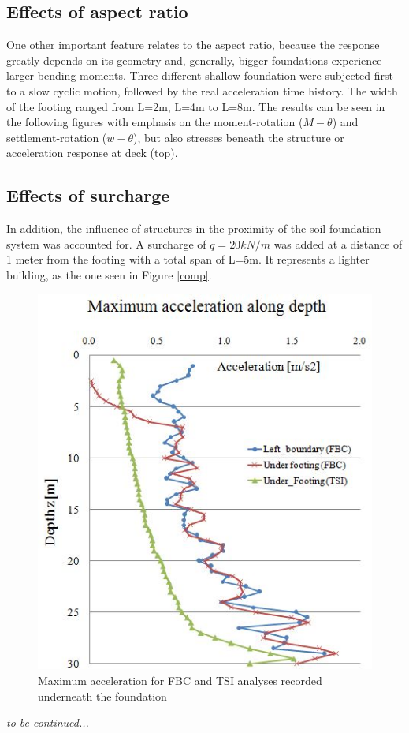 \subsection{Effects of aspect ratio}
One other important feature relates to the aspect ratio, because the response greatly depends on its geometry and, generally, bigger foundations experience larger bending moments. Three different shallow foundation were subjected first to a slow cyclic motion, followed by the real acceleration time history. The width of the footing ranged from L=2m, L=4m to L=8m. The results can be seen in the following figures with emphasis on the moment-rotation ($M-\theta$) and settlement-rotation ($w-\theta$), but also stresses beneath the structure or acceleration response at deck (top).


\subsection{Effects of surcharge}
In addition, the influence of structures in the proximity of the soil-foundation system was accounted for. A surcharge of $q=20kN/m$ was added at a distance of 1 meter from the footing with a total span of L=5m. It represents a lighter building, as the one seen in Figure \ref{comp}.


	\begin{figure}[!h]
		\centering
		\includegraphics[width=0.6 \linewidth]{"max_ax"}
		\caption{Maximum acceleration for FBC and TSI analyses recorded underneath the foundation}
		\label{maxax}
	\end{figure}
	
\textit{to be continued...}	

\newpage



